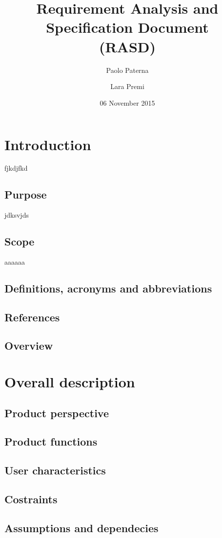 \documentclass[12pt,a4paper]{article}
\begin{document}
	\title{Requirement Analysis and Specification Document\\
		(RASD)}
	\author{Paolo Paterna \and Lara Premi}
	\date{06 November 2015}
	\maketitle
	\newpage
	\tableofcontents
	\newpage
	
	\section{Introduction}
	fjkdjfkd
	\subsection{Purpose}
	jdksvjds
	\subsection{Scope}
	aaaaaa
	\subsection{Definitions, acronyms and abbreviations}
	\subsection{References}
	\subsection{Overview}
	\section{Overall description}
	\subsection{Product perspective}
	\subsection{Product functions}
	\subsection{User characteristics}
	\subsection{Costraints}
	\subsection{Assumptions and dependecies}
\end{document}

